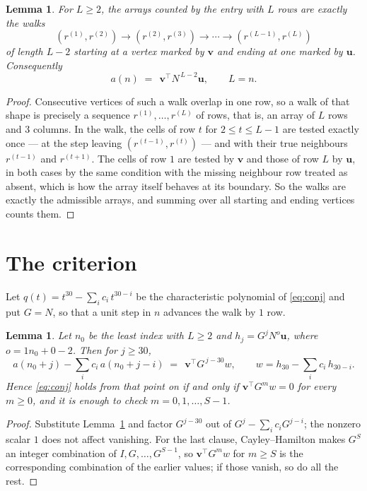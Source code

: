 \documentclass[11pt,a4paper]{article}
\theoremstyle{plain}
\newtheorem{lemma}[theorem]{Lemma}
\theoremstyle{definition}
\begin{document}
\begin{lemma}\label{lem:walk}
For $L\ge2$, the arrays counted by the entry with $L$ rows are exactly the walks
\[
(r^{(1)},r^{(2)})\to(r^{(2)},r^{(3)})\to\cdots\to(r^{(L-1)},r^{(L)})
\]
of length $L-2$ starting at a vertex marked by $\mathbf{v}$ and ending at one marked by
$\mathbf{u}$. Consequently
\[
a(n)\;=\;\,\mathbf{v}^{\!\top}N^{\,L-2}\mathbf{u},\qquad L=n .
\]
\end{lemma}

\begin{proof}
Consecutive vertices of such a walk overlap in one row, so a walk of that shape is
precisely a sequence $r^{(1)},\dots,r^{(L)}$ of rows, that is, an array of $L$ rows
and $3$ columns. In the walk, the cells of row $t$ for $2\le t\le L-1$ are tested
exactly once --- at the step leaving $(r^{(t-1)},r^{(t)})$ --- and with their true
neighbours $r^{(t-1)}$ and $r^{(t+1)}$. The cells of row $1$ are tested by
$\mathbf{v}$ and those of row $L$ by $\mathbf{u}$, in both cases by the same condition
with the missing neighbour row treated as absent, which is how the array itself behaves at
its boundary. So the walks are exactly the admissible arrays, and summing over all starting
and ending vertices counts them.
\end{proof}

\section{The criterion}

Let $q(t)=t^{30}-\sum_i c_i\,t^{30-i}$ be the characteristic polynomial of
\eqref{eq:conj} and put $G=N$, so that a unit step in $n$ advances the walk by
$1$ row.

\begin{lemma}\label{lem:crit}
Let $n_0$ be the least index with $L\ge2$ and $h_j=G^{j}N^{o}\mathbf{u}$, where
$o=1n_0+0-2$. Then for $j\ge30$,
\[
a(n_0+j)-\sum_i c_i\,a(n_0+j-i)\;=\;\,\mathbf{v}^{\!\top}G^{\,j-30}w,
\qquad w=h_{30}-\sum_i c_i\,h_{30-i} .
\]
Hence \eqref{eq:conj} holds from that point on if and only if
$\mathbf{v}^{\!\top}G^{m}w=0$ for every $m\ge0$, and it is enough to check
$m=0,1,\dots,S-1$.
\end{lemma}

\begin{proof}
Substitute Lemma~\ref{lem:walk} and factor $G^{j-30}$ out of
$G^{j}-\sum_ic_iG^{j-i}$; the nonzero scalar $1$ does not affect
vanishing. For the last clause, Cayley--Hamilton makes $G^{S}$ an integer combination of
$I,G,\dots,G^{S-1}$, so $\mathbf{v}^{\!\top}G^{m}w$ for $m\ge S$ is the corresponding
combination of the earlier values; if those vanish, so do all the rest.
\end{proof}
\end{document}
